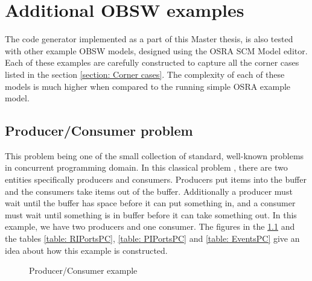 $  $%
\chapter{Additional OBSW examples}
\label{chap: Extra examples}

The code generator implemented as a part of this Master thesis, is also tested with other example OBSW models, designed using the OSRA SCM Model editor. Each of these examples are carefully constructed to capture all the corner cases listed in the section \cref{section: Corner cases}. The complexity of each of these models is much higher when compared to the running simple OSRA example model.

\section{Producer/Consumer problem}
This problem being one of the small collection of standard, well-known problems in concurrent programming domain. In this classical problem \cite{ProducerConsumer}, there are two entities specifically producers and consumers. Producers put items into the buffer and the consumers take items out of the buffer. Additionally a producer must wait until the buffer has space before it can put something in, and a consumer must wait until something is in buffer before it can take something out. In this example, we have two producers and one consumer. The figures in the \cref{fig: FiguresPC} and the tables \cref{table: RIPortsPC}, \cref{table: PIPortsPC} and \cref{table: EventsPC} give an idea about how this example is constructed.   

\begin{figure}[h]
	\centering
	\hfill
	\hfill
	\label{fig: FiguresPC}
	\caption{Producer/Consumer example}
\end{figure}

